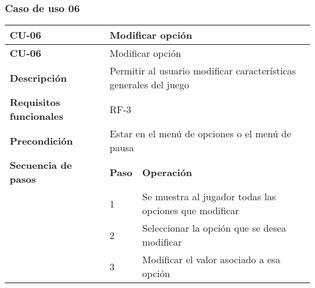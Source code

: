 \subsubsection{Caso de uso 06}
\begin{longtable}{lll}
\textbf{CU-06}                                   & \multicolumn{2}{l}{Modificar opción}                                                                                                                                               \\ \hline
\endfirsthead
\textbf{CU-06}                                   & \multicolumn{2}{l}{Modificar opción}                                                                                                                                               \\ \hline
\endhead
%
\textbf{Descripción}                             & \multicolumn{2}{l}{Permitir al usuario modificar características generales del juego}                                                                                              \\ \hline
\textbf{Requisitos funcionales}                  & \multicolumn{2}{l}{RF-3}                                                                                                                                                   \\ \hline
\textbf{Precondición}                            & \multicolumn{2}{l}{Estar en el menú de opciones o el menú de pausa}                                                                                                                \\ \hline
\multicolumn{1}{l|}{\textbf{Secuencia de pasos}} & \textbf{Paso}                                                        & \textbf{Operación}                                                                                          \\ \cline{2-3} 
\multicolumn{1}{l|}{}                            & 1                                                                    & Se muestra al jugador todas las opciones que modificar                                                      \\
\multicolumn{1}{l|}{}                            & 2                                                                    & Seleccionar la opción que se desea modificar                                                                \\
\multicolumn{1}{l|}{}                            & 3                                                                    & Modificar el valor asociado a esa opción                                                                    \\

\end{longtable}
